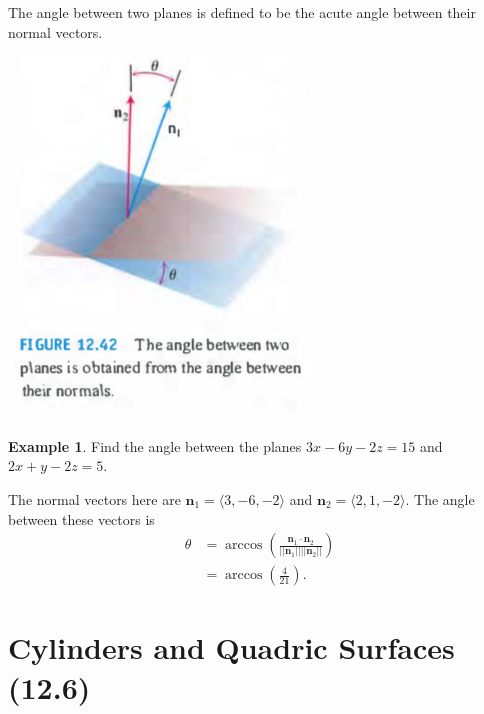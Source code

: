\documentclass[12pt, letter]{article}
\theoremstyle{plain}
\numberwithin{theorem}{section}
\theoremstyle{definition}
\newtheorem{example}[theorem]{Example}
\begin{document}
\bigskip

\hrulefill

\bigskip

The angle between two planes is defined to be the acute angle between their normal vectors.

\bigskip

\begin{center}
\includegraphics[scale=0.7]{m1_f21}
\end{center}

\bigskip

\hrulefill

\bigskip

\begin{example}
Find the angle between the planes $3x-6y-2z=15$ and $2x+y-2z=5$.

\smallskip

The normal vectors here are $\bm{n}_1 = \langle 3, -6, -2 \rangle$ and $\bm{n}_2 = \langle 2, 1, -2 \rangle$. The angle between these vectors is
\begin{align*}
\theta &= \arccos\left(\frac{\bm{n}_1 \cdot \bm{n}_2}{||\bm{n}_1|| ||\bm{n}_2||}\right)\\
&= \arccos \left(\frac{4}{21}\right).
\end{align*}
\end{example}

\newpage


\section{Cylinders and Quadric Surfaces (12.6)}
\end{document}

